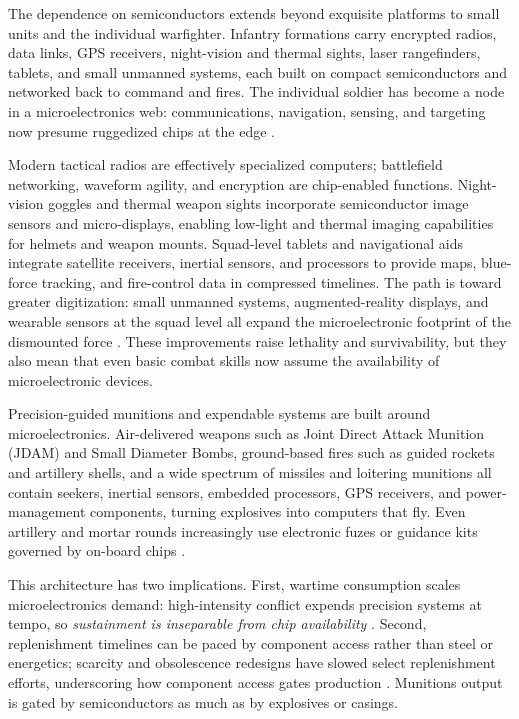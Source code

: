 The dependence on semiconductors extends beyond exquisite platforms to small units and the individual warfighter. Infantry formations carry encrypted radios, data links, GPS receivers, night-vision and thermal sights, laser rangefinders, tablets, and small unmanned systems, each built on compact semiconductors and networked back to command and fires. The individual soldier has become a node in a microelectronics web: communications, navigation, sensing, and targeting now presume ruggedized chips at the edge \parencite{us_army_army_2025,national_academies_assured_2024}.

Modern tactical radios are effectively specialized computers; battlefield networking, waveform agility, and encryption are chip-enabled functions. Night-vision goggles and thermal weapon sights incorporate semiconductor image sensors and micro-displays, enabling low-light and thermal imaging capabilities for helmets and weapon mounts. Squad-level tablets and navigational aids integrate satellite receivers, inertial sensors, and processors to provide maps, blue-force tracking, and fire-control data in compressed timelines. The path is toward greater digitization: small unmanned systems, augmented-reality displays, and wearable sensors at the squad level all expand the microelectronic footprint of the dismounted force \parencite{program_executive_office_soldier_project_2025}. These improvements raise lethality and survivability, but they also mean that even basic combat skills now assume the availability of microelectronic devices.

Precision-guided munitions and expendable systems are built around microelectronics. Air-delivered weapons such as Joint Direct Attack Munition (JDAM) and Small Diameter Bombs, ground-based fires such as guided rockets and artillery shells, and a wide spectrum of missiles and loitering munitions all contain seekers, inertial sensors, embedded processors, GPS receivers, and power-management components, turning explosives into computers that fly. Even artillery and mortar rounds increasingly use electronic fuzes or guidance kits governed by on-board chips \parencite{Hoehn2021,pergolizzi_pgk_2010}.

This architecture has two implications. First, wartime consumption scales microelectronics demand: high-intensity conflict expends precision systems at tempo, so \emph{sustainment is inseparable from chip availability} \parencite{Hoehn2021, jones_empty_2023}. Second, replenishment timelines can be paced by component access rather than steel or energetics; scarcity and obsolescence redesigns have slowed select replenishment efforts, underscoring how component access gates production \parencite{mondschein_securing_2022, jones_empty_2023}. Munitions output is gated by semiconductors as much as by explosives or casings.

